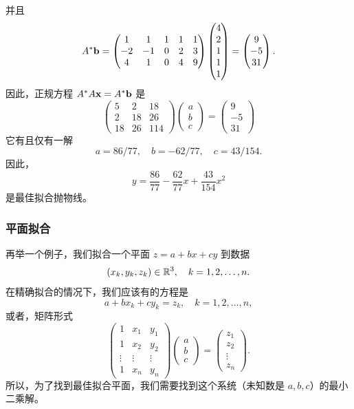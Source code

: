 并且
$$A^*\mathbf{b} = \begin{pmatrix} 1 & 1 & 1 & 1 & 1 \\ -2 & -1 & 0 & 2 & 3 \\ 4 & 1 & 0 & 4 & 9 \end{pmatrix} \begin{pmatrix} 4 \\ 2 \\ 1 \\ 1 \\ 1 \end{pmatrix} = \begin{pmatrix} 9 \\ -5 \\ 31 \end{pmatrix}.$$
因此，正规方程 $A^*A\mathbf{x} = A^*\mathbf{b}$ 是
$$\begin{pmatrix} 5 & 2 & 18 \\ 2 & 18 & 26 \\ 18 & 26 & 114 \end{pmatrix} \begin{pmatrix} a \\ b \\ c \end{pmatrix} = \begin{pmatrix} 9 \\ -5 \\ 31 \end{pmatrix}$$
它有且仅有一解
$$a = 86/77, \quad b = -62/77, \quad c = 43/154.$$
因此，
$$y = \frac{86}{77} - \frac{62}{77}x + \frac{43}{154}x^2$$
是最佳拟合抛物线。

\subsubsection{平面拟合}\label{sec:05-04-04-02}

再举一个例子，我们拟合一个平面 $z = a + bx + cy$ 到数据 $$(x_k, y_k, z_k) \in \mathbb{R}^3, \quad k=1, 2, \dots, n.$$在精确拟合的情况下，我们应该有的方程是
$$a + bx_k + cy_k = z_k, \quad k=1, 2, \dots, n,$$
或者，矩阵形式
$$\begin{pmatrix} 1 & x_1 & y_1 \\ 1 & x_2 & y_2 \\ \vdots & \vdots & \vdots \\ 1 & x_n & y_n \end{pmatrix} \begin{pmatrix} a \\ b \\ c \end{pmatrix} = \begin{pmatrix} z_1 \\ z_2 \\ \vdots \\ z_n \end{pmatrix}.$$
所以，为了找到最佳拟合平面，我们需要找到这个系统（未知数是 $a, b, c$）的最小二乘解。

